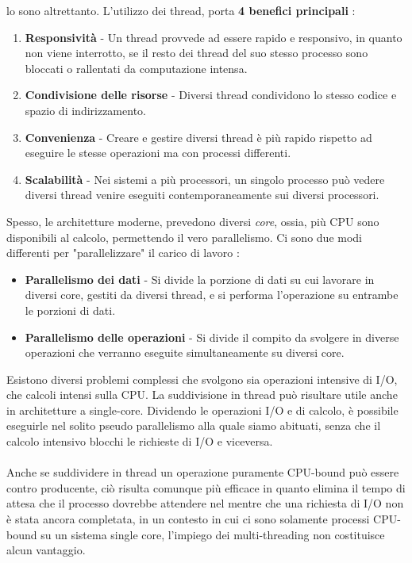 \documentclass[12pt, letterpaper]{article}
\newcommand{\acc}{\\\hphantom{}\\}
\begin{document}
lo sono altrettanto. L'utilizzo dei thread, porta \textbf{4 benefici principali} : \begin{enumerate}
    \item \textbf{Responsività} - Un thread provvede ad essere rapido e responsivo, in quanto non viene interrotto, se il resto 
    dei thread del suo stesso processo sono bloccati o rallentati da computazione intensa.
    \item \textbf{Condivisione delle risorse} - Diversi thread condividono lo stesso codice e spazio di indirizzamento.
    \item \textbf{Convenienza} - Creare e gestire diversi thread è più rapido rispetto ad eseguire le stesse operazioni ma con 
    processi differenti. 
    \item \textbf{Scalabilità} - Nei sistemi a più processori, un singolo processo può vedere diversi thread venire 
    eseguiti contemporaneamente sui diversi processori.
\end{enumerate}
Spesso, le architetture moderne, prevedono diversi \textit{core}, ossia, più CPU sono disponibili al calcolo, 
permettendo il vero parallelismo. Ci sono due modi differenti per "parallelizzare" il carico di lavoro :\begin{itemize}
    \item \textbf{Parallelismo dei dati} - Si divide la porzione di dati su cui lavorare in diversi core, gestiti 
    da diversi thread, e si performa l'operazione su entrambe le porzioni di dati.
    \item \textbf{Parallelismo delle operazioni} - Si divide il compito da svolgere in diverse operazioni che verranno 
    eseguite simultaneamente su diversi core.
\end{itemize}
Esistono diversi problemi complessi che svolgono sia operazioni intensive di I/O, che calcoli 
intensi sulla CPU. La suddivisione in thread può risultare utile anche in architetture a single-core. Dividendo le operazioni 
I/O e di calcolo, è possibile eseguirle nel solito pseudo parallelismo alla quale siamo abituati, senza che 
il calcolo intensivo blocchi le richieste di I/O e viceversa. \acc Anche se suddividere in thread un operazione 
puramente CPU-bound può essere contro producente, ciò risulta comunque più efficace in quanto elimina il tempo di attesa 
che il processo dovrebbe attendere nel mentre che una richiesta di I/O non è stata ancora completata, in un contesto in cui 
ci sono solamente processi CPU-bound su un sistema single core, l'impiego dei multi-threading non costituisce alcun vantaggio.
\end{document}

